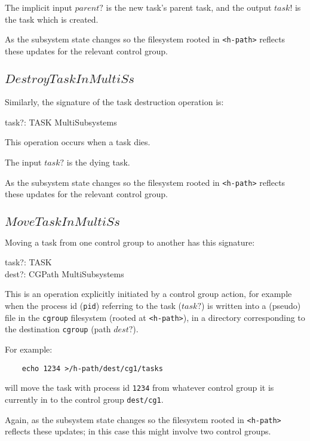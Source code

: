 \documentclass[a4paper,twoside,12pt]{article}
\begin{document}
The implicit input $parent?$ is the new task's parent task, and the output $task!$ is the task which is created.

As the subsystem state changes so the
filesystem rooted in \texttt{<h-path>} reflects these updates for the relevant control group.

\subsection{$DestroyTaskInMultiSs$}

Similarly, the signature of the task destruction operation is:
\begin{schema*}
    task?: TASK
\also 
    \Delta MultiSubsystems
\end{schema*}
This operation occurs when a task dies.

The input $task?$ is the dying task.

As the subsystem state changes so the
filesystem rooted in \texttt{<h-path>} reflects these updates for the relevant control group.


\subsection{$MoveTaskInMultiSs$}

Moving a task from one control group to another has this signature:
\begin{schema*}
    task?: TASK \\
    dest?: CGPath
\also 
    \Delta MultiSubsystems
\end{schema*}
This is an operation explicitly initiated by a control group action, for example when
the process id (\texttt{pid}) referring to the task ($task?$) is written into a 
(pseudo) file in the \texttt{cgroup} filesystem 
(rooted at \texttt{<h-path>}),
in a directory corresponding to the destination \texttt{cgroup} (path $dest?$).

For example:
\begin{verbatim}
    echo 1234 >/h-path/dest/cg1/tasks
\end{verbatim}
will move the task with process id \texttt{1234} from whatever control group it is currently in to 
the control group \texttt{dest/cg1}.

Again, as the subsystem state changes so the
filesystem rooted in \texttt{<h-path>} reflects these updates; in this case this might involve two control groups.
\end{document}
